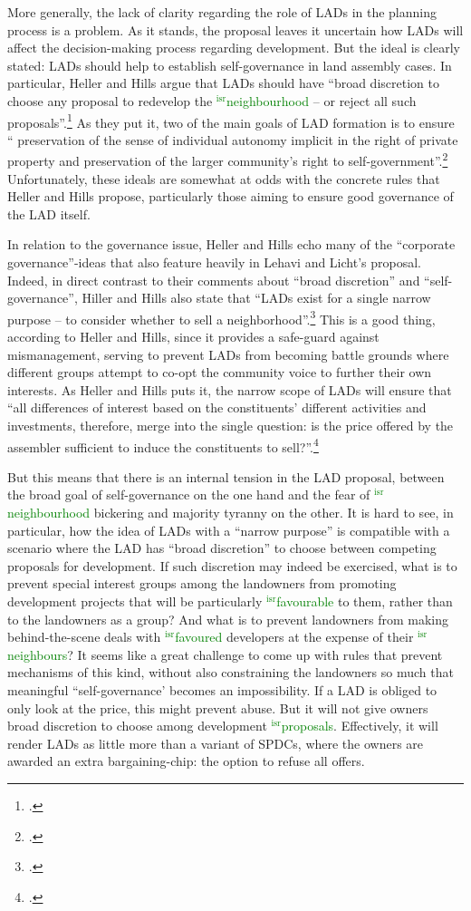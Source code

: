 \documentclass[12pt,a4paper]{book} %
\newcommand{\isr}[1]{\textcolor{green}{$^{\textrm{isr}}${#1}}}
\begin{document}
More generally, the lack of clarity regarding the role of LADs in the planning process is a problem. As it stands, the proposal leaves it uncertain how LADs will affect the decision-making process regarding development. But the ideal is clearly stated: LADs should help to establish self-governance in land assembly cases. In particular, Heller and Hills argue that LADs should have ``broad discretion to choose any proposal to redevelop the \isr{neighbourhood} -- or reject all such proposals''.\footcite[See][1496]{heller08} As they put it, two of the main goals of LAD formation is to ensure `` preservation of the sense of individual autonomy implicit in the right of private property and preservation of the larger community's right to self-government''.\footcite[See][1498]{heller08} Unfortunately, these ideals are somewhat at odds with the concrete rules that Heller and Hills propose, particularly those aiming to ensure good governance of the LAD itself. 

In relation to the governance issue, Heller and Hills echo many of the ``corporate governance''-ideas that also feature heavily in Lehavi and Licht's proposal. Indeed, in direct contrast to their comments about ``broad discretion'' and ``self-governance'', Hiller and Hills also state that ``LADs exist for a single narrow purpose -- to consider whether to sell a neighborhood''.\footcite[See][1500]{heller08} This is a good thing, according to Heller and Hills, since it provides a safe-guard against mismanagement, serving to prevent LADs from becoming battle grounds where different groups attempt to co-opt the community voice to further their own interests. As Heller and Hills puts it, the narrow scope of LADs will ensure that ``all differences of interest based on the constituents' different activities and investments, therefore, merge into the single question: is the price offered by the assembler sufficient to induce the constituents to sell?''.\footcite[1500]{heller08}

But this means that there is an internal tension in the LAD proposal, between the broad goal of self-governance on the one hand and the fear of \isr{neighbourhood} bickering and majority tyranny on the other. It is hard to see, in particular, how the idea of LADs with a ``narrow purpose'' is compatible with a scenario where the LAD has ``broad discretion'' to choose between competing proposals for development. If such discretion may indeed be exercised, what is to prevent special interest groups among the landowners from promoting development projects that will be particularly \isr{favourable} to them, rather than to the landowners as a group? And what is to prevent landowners from making behind-the-scene deals with \isr{favoured} developers at the expense of their \isr{neighbours}? It seems like a great challenge to come up with rules that prevent mechanisms of this kind, without also constraining the landowners so much that meaningful ``self-governance' becomes an impossibility. If a LAD is obliged to only look at the price, this might prevent abuse. But it will not give owners broad discretion to choose among development \isr{proposals}. Effectively, it will render LADs as little more than a variant of SPDCs, where the owners are awarded an extra bargaining-chip: the option to refuse all offers. 
\end{document}

